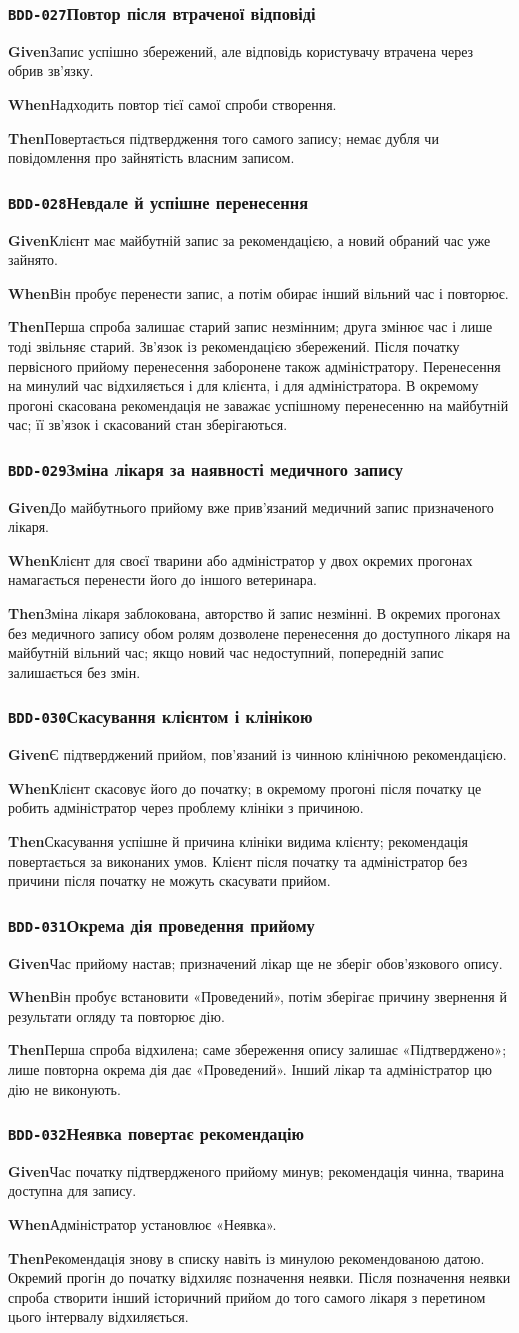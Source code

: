 \documentclass[11pt,a4paper]{article}
\newcommand{\scenario}[5]{%
  \Needspace{8\baselineskip}%
  \subsubsection*{\hypertarget{#1}{\texttt{#1}}\quad #2}%
  \textbf{Given}\quad #3\par
  \textbf{When}\quad #4\par
  \textbf{Then}\quad #5\par\medskip}
\begin{document}
\scenario{BDD-027}{Повтор після втраченої відповіді}{Запис успішно збережений, але відповідь користувачу втрачена через обрив зв’язку.}{Надходить повтор тієї самої спроби створення.}{Повертається підтвердження того самого запису; немає дубля чи повідомлення про зайнятість власним записом.}

\scenario{BDD-028}{Невдале й успішне перенесення}{Клієнт має майбутній запис за рекомендацією, а новий обраний час уже зайнято.}{Він пробує перенести запис, а потім обирає інший вільний час і повторює.}{Перша спроба залишає старий запис незмінним; друга змінює час і лише тоді звільняє старий. Зв’язок із рекомендацією збережений. Після початку первісного прийому перенесення заборонене також адміністратору. Перенесення на минулий час відхиляється і для клієнта, і для адміністратора. В окремому прогоні скасована рекомендація не заважає успішному перенесенню на майбутній час; її зв’язок і скасований стан зберігаються.}

\scenario{BDD-029}{Зміна лікаря за наявності медичного запису}{До майбутнього прийому вже прив’язаний медичний запис призначеного лікаря.}{Клієнт для своєї тварини або адміністратор у двох окремих прогонах намагається перенести його до іншого ветеринара.}{Зміна лікаря заблокована, авторство й запис незмінні. В окремих прогонах без медичного запису обом ролям дозволене перенесення до доступного лікаря на майбутній вільний час; якщо новий час недоступний, попередній запис залишається без змін.}

\scenario{BDD-030}{Скасування клієнтом і клінікою}{Є підтверджений прийом, пов’язаний із чинною клінічною рекомендацією.}{Клієнт скасовує його до початку; в окремому прогоні після початку це робить адміністратор через проблему клініки з причиною.}{Скасування успішне й причина клініки видима клієнту; рекомендація повертається за виконаних умов. Клієнт після початку та адміністратор без причини після початку не можуть скасувати прийом.}

\scenario{BDD-031}{Окрема дія проведення прийому}{Час прийому настав; призначений лікар ще не зберіг обов’язкового опису.}{Він пробує встановити «Проведений», потім зберігає причину звернення й результати огляду та повторює дію.}{Перша спроба відхилена; саме збереження опису залишає «Підтверджено»; лише повторна окрема дія дає «Проведений». Інший лікар та адміністратор цю дію не виконують.}

\scenario{BDD-032}{Неявка повертає рекомендацію}{Час початку підтвердженого прийому минув; рекомендація чинна, тварина доступна для запису.}{Адміністратор установлює «Неявка».}{Рекомендація знову в списку навіть із минулою рекомендованою датою. Окремий прогін до початку відхиляє позначення неявки. Після позначення неявки спроба створити інший історичний прийом до того самого лікаря з перетином цього інтервалу відхиляється.}
\end{document}
